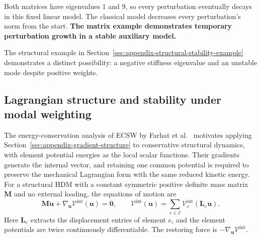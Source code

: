 \documentclass[a4paper,12pt]{article}
\newcommand{\vect}[1]{\boldsymbol{#1}}
\newcommand{\matr}[1]{\boldsymbol{#1}}
\begin{document}
\medskip
Both matrices have eigenvalues 1 and 9, so every perturbation eventually decays in this fixed linear model. The classical model decreases every perturbation's norm from the start. \textbf{The matrix example demonstrates temporary perturbation growth in a stable auxiliary model.}

The structural example in Section~\ref{sec:appendix-structural-stability-example} demonstrates a distinct possibility: a negative stiffness eigenvalue and an unstable mode despite positive weights.

\subsection{Lagrangian structure and stability under modal weighting}
\label{sec:appendix-mechanical-energy}
\label{sec:appendix-lagrangian-compatibility}

The energy-conservation analysis of ECSW by Farhat et al.~\cite{farhat2015structure} motivates applying Section~\ref{sec:appendix-gradient-structure} to conservative structural dynamics, with element potential energies as the local scalar functions. Their gradients generate the internal vector, and retaining one common potential is required to preserve the mechanical Lagrangian form with the same reduced kinetic energy. For a structural HDM with a constant symmetric positive definite mass matrix $\matr{M}$ and no external loading, the equations of motion are
\begin{equation}
 \matr{M}\ddot{\vect{u}}+\nabla_{\vect{u}}\mathcal V^{\mathrm{int}}(\vect{u})
 =\vect{0},
 \qquad
 \mathcal V^{\mathrm{int}}(\vect{u})
 =\sum_{e\in\mathcal E}\mathcal V_e^{\mathrm{int}}(\matr{L}_e\vect{u}).
 \label{eq:appendix-hdm-potential}
\end{equation}
Here $\matr{L}_e$ extracts the displacement entries of element $e$, and the element potentials are twice continuously differentiable. The restoring force is $-\nabla_{\vect{u}}\mathcal V^{\mathrm{int}}$.
\end{document}
